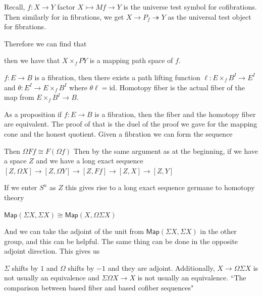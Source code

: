 \documentclass[12pt]{article}
\theoremstyle{definition}
\begin{document}
Recall, $f:X\to Y$ factor $X\rightarrowtail Mf\to Y$ is the universe test symbol for cofibrations. Then similarly for in fibrations, we get $X\to P_f\twoheadrightarrow Y$ as the universal test object for fibrations. 

Therefore we can find that 
\begin{center}
	then we have that $X\times_fPY$ is a mapping path space of $f$. 
\end{center}
$f:E\to B$ is a fibration, then there exists a path lifting function $\ell:E\times _f B^I\to E^I$ and $\theta:E^I\to E\times_f B^I$  where $\theta\ell = \text{id}$. Homotopy fiber is the actual fiber of the map from $E\times_f B^I\to B$. 

As a proposition if $f:E\to B$ is a fibration, then the fiber and the homotopy fiber are equivalent. The proof of that is the duel of the proof we gave for the mapping cone and the honest quotient. Given a fibration we can form the sequence \begin{center}
\end{center}
Then $\Omega Ff\cong F(\Omega f)$
Then by the same argument as at the beginning, if we have a space $Z$ and we have a long exact sequence 
$[Z,\Omega X]\to [Z,\Omega Y]\to [Z,Ff]\to  [Z,X]\to [Z,Y]$

If we enter $S^n$ as $Z$ this gives rise to a long exact sequence germane to homotopy theory


$\mathsf{Map}(\Sigma X,\Sigma X)\cong \mathsf{Map}(X,\Omega\Sigma X)$

And we can take the adjoint of the unit from $\mathsf{Map}(\Sigma X,\Sigma X)$ in the other group, and this can be helpful. The same thing can be done in the opposite adjoint direction. This gives us

\begin{center}
\end{center}
$\Sigma$ shifts by $1$ and $\Omega$ shifts by $-1$ and they are adjoint. Additionally, $X\to \Omega\Sigma X$ is not usually an equivalence and $\Sigma\Omega X\to X$ is not usually an equivalence. ``The comparison between based fiber and based cofiber sequences"
\end{document}
